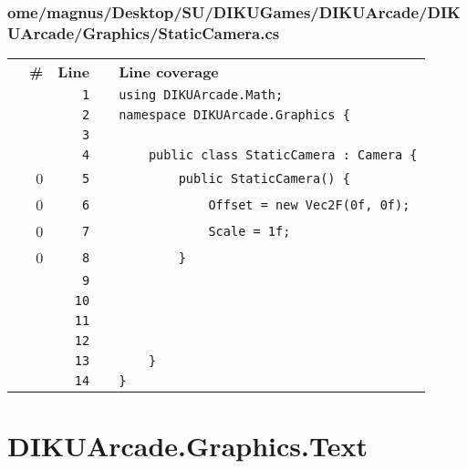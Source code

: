 \documentclass[a4paper,landscape,10pt]{article}
\begin{document}
\subsubsection{ome/magnus/Desktop/SU/DIKUGames/DIKUArcade/DIKUArcade/Graphics/StaticCamera.cs}
\begin{longtable}[l]{lrrll}
\textbf{} & \textbf{\#} & \textbf{Line} & \textbf{} & \textbf{Line coverage}\\
\cellcolor{gray} &  & \verb~1~ & & \verb~using DIKUArcade.Math;~\\
\cellcolor{gray} &  & \verb~2~ & & \verb~namespace DIKUArcade.Graphics {~\\
\cellcolor{gray} &  & \verb~3~ & & \verb~~\\
\cellcolor{gray} &  & \verb~4~ & & \verb~    public class StaticCamera : Camera {~\\
\cellcolor{red} & 0 & \verb~5~ & & \verb~        public StaticCamera() {~\\
\cellcolor{red} & 0 & \verb~6~ & & \verb~            Offset = new Vec2F(0f, 0f);~\\
\cellcolor{red} & 0 & \verb~7~ & & \verb~            Scale = 1f;~\\
\cellcolor{red} & 0 & \verb~8~ & & \verb~        }~\\
\cellcolor{gray} &  & \verb~9~ & & \verb~~\\
\cellcolor{gray} &  & \verb~10~ & & \verb~~\\
\cellcolor{gray} &  & \verb~11~ & & \verb~~\\
\cellcolor{gray} &  & \verb~12~ & & \verb~~\\
\cellcolor{gray} &  & \verb~13~ & & \verb~    }~\\
\cellcolor{gray} &  & \verb~14~ & & \verb~}~\\
\end{longtable}
\newpage
\section{DIKUArcade.Graphics.Text}
\end{document}
